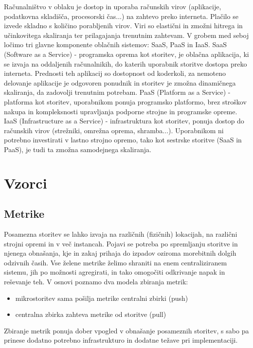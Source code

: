 \documentclass[a4paper, 12pt]{book}
\begin{document}
Računalništvo v oblaku je dostop in uporaba računskih virov (aplikacije, podatkovna skladišča, procesorski čas...) na zahtevo preko interneta.
Plačilo se izvede skladno s količino porabljenih virov.
Viri so elastični in zmožni hitrega in učinkovitega skaliranja ter prilagajanja trenutnim zahtevam.
V grobem med seboj ločimo tri glavne komponente oblačnih sistemov: SaaS, PaaS in IaaS.
SaaS (Software as a Service) - programska oprema kot storitev, je oblačna aplikacija, ki se izvaja na oddaljenih računalnikih, do katerih uporabnik storitve dostopa preko interneta. 
Prednosti teh aplikacij so dostopnost od koderkoli, za nemoteno delovanje aplikacije je odgovoren ponudnik in storitev je zmožna dinamičnega skaliranja, da zadovolji trenutnim potrebam.
PaaS (Platform as a Service) - platforma kot storitev, uporabnikom ponuja programsko platformo, brez stroškov nakupa in kompleksnosti upravljanja podporne strojne in programske opreme.
IaaS (Infrastructure as a Service) - infrastruktura kot storitev, ponuja dostop do računskih virov (strežniki, omrežna oprema, shramba...).
Uporabnikom ni potrebno investirati v lastno strojno opremo, tako kot sestrske storitve (SaaS in PaaS), je tudi ta zmožna samodejnega skaliranja. \cite{ibmCloudComputing}


\section{Vzorci}

\subsection{Metrike}

Posamezna storitev se lahko izvaja na različnih (fizičnih) lokacijah, na različni strojni opremi in v več instancah.
Pojavi se potreba po spremljanju storitve in njenega obnašanja, kje in zakaj prihaja do izpadov oziroma morebitnih dolgih odzivnih časih.
Vse želene metrike želimo shraniti na enem centraliziranem sistemu, jih po možnosti agregirati, in tako omogočiti odkrivanje napak in reševanje teh.
V osnovi poznamo dva modela zbiranja metrik: 
\begin{itemize}
	\item mikrostoritev sama pošilja metrike centralni zbirki (push)
	\item centralna zbirka zahteva metrike od storitve (pull)
\end{itemize}

Zbiranje metrik ponuja dober vpogled v obnašanje posameznih storitev, s sabo pa prinese dodatno potrebno infrastrukturo in dodatne težave pri implementaciji.\cite{ApplicationMetrics}
\end{document}

